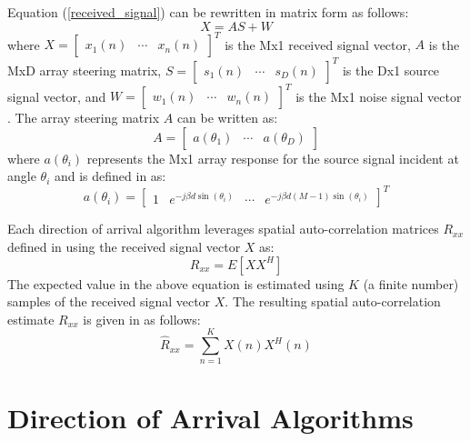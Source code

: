 \documentclass[conference]{IEEEtran}
\begin{document}
	Equation (\ref{received_signal}) can be rewritten in matrix form as follows:
	\begin{equation}
		X = AS + W
	\end{equation}
	where $X = \begin{bmatrix} x_1(n) & \cdots & x_n(n)\end{bmatrix}^T$ is the Mx1 received signal vector, $A$ is the MxD array steering matrix, $S = \begin{bmatrix} s_1(n) & \cdots & s_D(n)\end{bmatrix}^T$ is the Dx1 source signal vector, and $W = \begin{bmatrix} w_1(n) & \cdots & w_n(n)\end{bmatrix}^T$ is the Mx1 noise signal vector \cite{doa_algorithms_raghu}. The array steering matrix $A$ can be written as:
	\begin{equation}
		A = \begin{bmatrix} a(\theta_1) & \cdots & a(\theta_D) \end{bmatrix}
	\end{equation}
	where $a(\theta_i)$ represents the Mx1 array response for the source signal incident at angle $\theta_i$ and is defined in \cite{doa_algorithms_raghu} as:
	\begin{equation}
		\label{array_response_vector}
	 	a(\theta_i) = \begin{bmatrix} 1 & e^{-j{\beta}d\sin(\theta_i)} & \cdots & e^{-j{\beta}d(M-1)\sin(\theta_i)}\end{bmatrix}^T
	\end{equation}
	
		Each direction of arrival algorithm leverages spatial auto-correlation matrices $R_{xx}$ defined in \cite{doa_algorithms_raghu}  using the received signal vector $X$ as:
	\begin{equation}
		R_{xx} = E[XX^H]
	\end{equation}
	The expected value in the above equation is estimated using $K$ (a finite number) samples of the received signal vector $X$. The resulting spatial auto-correlation estimate ${R}_{xx}$ is given in \cite{doa_algorithms_raghu} as follows: 
	\begin{equation}
		\label{spatial_matrix_estimate}
		\hat{R}_{xx} = \sum_{n=1}^{K}{X(n)X^H(n)}
	\end{equation}
	
	\section{Direction of Arrival Algorithms}
	
\end{document}
